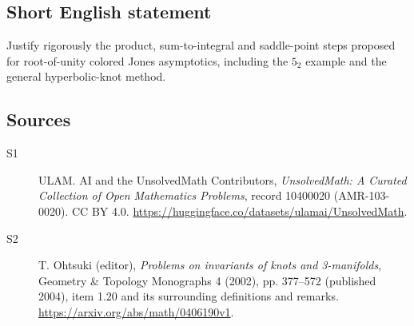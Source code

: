 \documentclass[11pt]{article}
\begin{document}
\subsection{Short English statement}
Justify rigorously the product, sum-to-integral and saddle-point steps proposed for root-of-unity colored Jones asymptotics, including the $5_2$ example and the general hyperbolic-knot method.
\subsection{Sources}
\begin{description}
\item[\hypertarget{source:10400020:1}{S1}] ULAM. AI and the UnsolvedMath Contributors, \emph{UnsolvedMath: A Curated Collection of Open Mathematics Problems}, record 10400020 (AMR-103-0020). CC BY 4.0. \url{https://huggingface.co/datasets/ulamai/UnsolvedMath}.
\item[\hypertarget{source:10400020:2}{S2}] T. Ohtsuki (editor), \emph{Problems on invariants of knots and 3-manifolds}, Geometry \& Topology Monographs 4 (2002), pp. 377--572 (published 2004), item 1.20 and its surrounding definitions and remarks. \url{https://arxiv.org/abs/math/0406190v1}.
\end{description}
\label{end:10400020}
\end{document}
